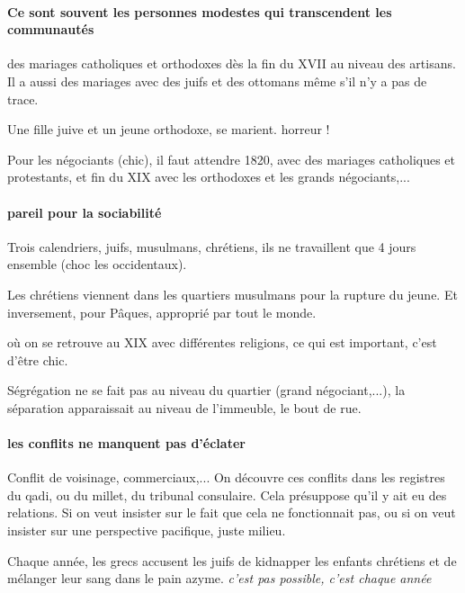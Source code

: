 \paragraph{Ce sont souvent les personnes modestes qui transcendent les communautés} des mariages catholiques et orthodoxes dès la fin du XVII au niveau des artisans. Il a aussi des mariages avec des juifs et des ottomans même s'il n'y a pas de trace.
\begin{Ex}
    Une fille juive et un jeune orthodoxe, se marient. horreur ! 
\end{Ex}
Pour les négociants (chic), il faut attendre 1820, avec des mariages catholiques et protestants, et fin du XIX avec les orthodoxes et les grands négociants,...

\paragraph{pareil pour la sociabilité} Trois calendriers, juifs, musulmans, chrétiens, ils ne travaillent que 4 jours ensemble (choc les occidentaux). 
\begin{Ex}
    Les chrétiens viennent dans les quartiers musulmans pour la rupture du jeune. Et inversement, pour Pâques, approprié par tout le monde.
\end{Ex}

\begin{Ex}
    où on se retrouve au XIX avec différentes religions, ce qui est important, c'est d'être chic.
\end{Ex}

\begin{Ex}[Alexandrie]
    Ségrégation ne se fait pas au niveau du quartier (grand négociant,...), la séparation apparaissait au niveau de l'immeuble, le bout de rue. 
\end{Ex}

\paragraph{les conflits ne manquent pas d'éclater} Conflit de voisinage, commerciaux,... On découvre ces conflits dans les registres du qadi, ou du millet, du tribunal consulaire. Cela présuppose qu'il y ait eu des relations.
Si on veut insister sur le fait que cela ne fonctionnait pas, ou si on veut insister sur une perspective pacifique, juste milieu. 

\begin{Ex}
    Chaque année, les grecs accusent les juifs de kidnapper les enfants chrétiens et de mélanger leur sang dans le pain azyme. \textit{c'est pas possible, c'est chaque année}
\end{Ex}

